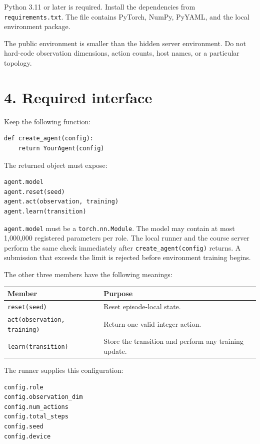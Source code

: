 \documentclass[12pt]{report}
\begin{document}
Python 3.11 or later is required. Install the dependencies from
\texttt{requirements.txt}. The file contains PyTorch, NumPy, PyYAML, and the
local environment package.

The public environment is smaller than the hidden server environment. Do not
hard-code observation dimensions, action counts, host names, or a particular
topology.

\section*{4. Required interface}

Keep the following function:

\begin{verbatim}
def create_agent(config):
    return YourAgent(config)
\end{verbatim}

The returned object must expose:

\begin{verbatim}
agent.model
agent.reset(seed)
agent.act(observation, training)
agent.learn(transition)
\end{verbatim}

\texttt{agent.model} must be a \texttt{torch.nn.Module}. The model may contain
at most 1,000,000 registered parameters per role.
The local runner and the course server perform the same check immediately after
\texttt{create\_agent(config)} returns. A submission that exceeds the limit is
rejected before environment training begins.

The other three members have the following meanings:

\begin{center}
\begin{tabular}{p{}p{}}
\toprule
\textbf{Member} & \textbf{Purpose} \\
\midrule
\texttt{reset(seed)} &
Reset episode-local state. \\
\texttt{act(observation, training)} &
Return one valid integer action. \\
\texttt{learn(transition)} &
Store the transition and perform any training update. \\
\bottomrule
\end{tabular}
\end{center}

The runner supplies this configuration:

\begin{verbatim}
config.role
config.observation_dim
config.num_actions
config.total_steps
config.seed
config.device
\end{verbatim}
\end{document}
